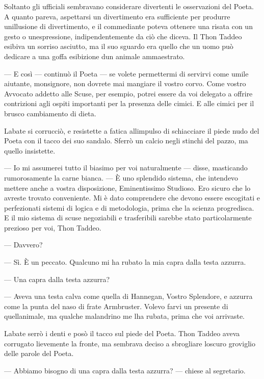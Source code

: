 Soltanto gli ufficiali sembravano considerare divertenti le osservazioni
del Poeta. A quanto pareva, aspettarsi un divertimento era sufficiente
per produrre un\textquotesingle illusione di divertimento, e il
commediante poteva ottenere una risata con un gesto o
un\textquotesingle espressione, indipendentemente da ciò che diceva. Il
Thon Taddeo esibiva un sorriso asciutto, ma il suo sguardo era quello
che un uomo può dedicare a una goffa esibizione d\textquotesingle un
animale ammaestrato.

--- E così --- continuò il Poeta --- se volete permettermi di servirvi
come umile aiutante, monsignore, non dovrete mai mangiare il vostro
corvo. Come vostro Avvocato addetto alle Scuse, per esempio, potrei
essere da voi delegato a offrire contrizioni agli ospiti importanti per
la presenza delle cimici. E alle cimici per il brusco cambiamento di
dieta.

L\textquotesingle abate si corrucciò, e resistette a fatica
all\textquotesingle impulso di schiacciare il piede nudo del Poeta con
il tacco dei suo sandalo. Sferrò un calcio negli stinchi del pazzo, ma
quello insistette.

--- Io mi assumerei tutto il biasimo per voi naturalmente --- disse,
masticando rumorosamente la carne bianca. --- È uno splendido sistema,
che intendevo mettere anche a vostra disposizione, Eminentissimo
Studioso. Ero sicuro che lo avreste trovato conveniente. Mi è dato
comprendere che devono essere escogitati e perfezionati sistemi di
logica e di metodologia, prima che la scienza progredisca. E il mio
sistema di scuse negoziabili e trasferibili sarebbe stato
particolarmente prezioso per voi, Thon Taddeo.

--- Davvero?

--- Sì. È un peccato. Qualcuno mi ha rubato la mia capra dalla testa
azzurra.

--- Una capra dalla testa azzurra?

--- Aveva una testa calva come quella di Hannegan, Vostro Splendore, e
azzurra come la punta del naso di frate Armbruster. Volevo farvi un
presente di quell\textquotesingle animale, ma qualche malandrino me
l\textquotesingle ha rubata, prima che voi arrivaste.

L\textquotesingle abate serrò i denti e posò il tacco sul piede del
Poeta. Thon Taddeo aveva corrugato lievemente la fronte, ma sembrava
deciso a sbrogliare l\textquotesingle oscuro groviglio delle parole del
Poeta.

--- Abbiamo bisogno di una capra dalla testa azzurra? --- chiese al
segretario.

